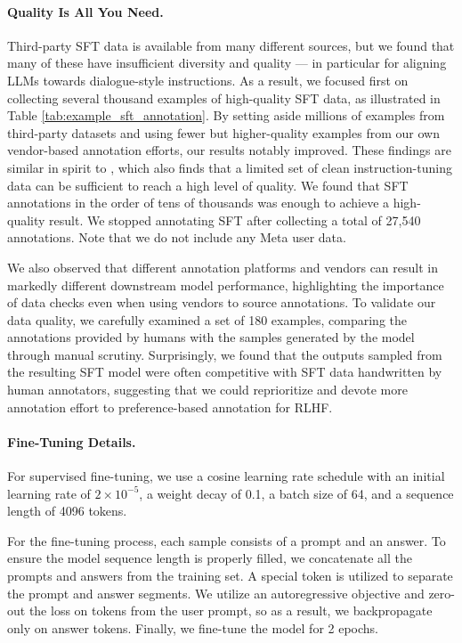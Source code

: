\documentclass{article}
\begin{document}
\paragraph{Quality Is All You Need.} 
Third-party SFT data is available from many different sources, but we found that many of these have insufficient diversity and quality --- in particular for aligning LLMs towards dialogue-style instructions. 
As a result, we focused first on collecting several thousand examples of high-quality SFT data, as illustrated in Table \ref{tab:example_sft_annotation}. 
By setting aside millions of examples from third-party datasets and using fewer but higher-quality examples from our own vendor-based annotation efforts, our results notably improved. These findings are similar in spirit to \cite{zhou-etal-2023-lima}, which also finds that a limited set of clean instruction-tuning data can be sufficient to reach a high level of quality. 
We found that SFT annotations in the order of tens of thousands was enough to achieve a high-quality result. We stopped annotating SFT after collecting a total of 27,540 annotations. 
Note that we do not include any Meta user data. 

We also observed that different annotation platforms and vendors can result in markedly different downstream model performance, highlighting the importance of data checks even when using vendors to source annotations. 
To validate our data quality, we carefully examined a set of 180 examples, comparing the annotations provided by humans with the samples generated by the model through manual scrutiny. Surprisingly, we found that the outputs sampled from the resulting SFT model were often competitive with SFT data handwritten by human annotators, suggesting that we could reprioritize and devote more annotation effort to preference-based annotation for RLHF.

\paragraph{Fine-Tuning Details.}
For supervised fine-tuning, we use a cosine learning rate schedule with an initial learning rate of $2\times 10^{-5}$, a weight decay of 0.1, a batch size of 64, and a sequence length of 4096 tokens.

For the fine-tuning process, each sample consists of a prompt and an answer. To ensure the model sequence length is properly filled, we concatenate all the prompts and answers from the training set. A special token is utilized to separate the prompt and answer segments. We utilize an autoregressive objective and zero-out the loss on tokens from the user prompt, so as a result, we backpropagate only on answer tokens.
Finally, we fine-tune the model for 2 epochs.
\end{document}
